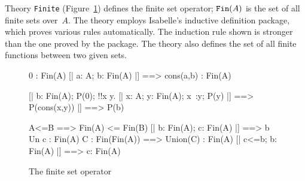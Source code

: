Theory {\tt Finite} (Figure~\ref{zf-fin}) defines the finite set operator;
${\tt Fin}(A)$ is the set of all finite sets over~$A$.  The theory employs
Isabelle's inductive definition package, which proves various rules
automatically.  The induction rule shown is stronger than the one proved by
the package.  The theory also defines the set of all finite functions
between two given sets.

\begin{figure}
\begin{ttbox}
      0 : Fin(A)
       [| a: A;  b: Fin(A) |] ==> cons(a,b) : Fin(A)

    [| b: Fin(A);
       P(0);
       !!x y. [| x: A;  y: Fin(A);  x~:y;  P(y) |] ==> P(cons(x,y))
    |] ==> P(b)

        A<=B ==> Fin(A) <= Fin(B)
         [| b: Fin(A);  c: Fin(A) |] ==> b Un c : Fin(A)
      C : Fin(Fin(A)) ==> Union(C) : Fin(A)
      [| c<=b;  b: Fin(A) |] ==> c: Fin(A)
\end{ttbox}
\caption{The finite set operator} \label{zf-fin}
\end{figure}

